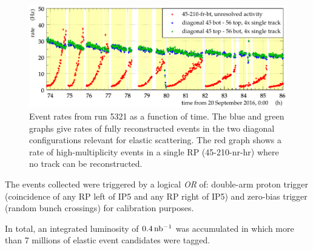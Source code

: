 \begin{figure}
\begin{center}
\includegraphics{fig/rates_vs_time.pdf}
\caption{%
Event rates from run 5321 as a function of time. The blue and green graphs give rates of fully reconstructed events in the two diagonal configurations relevant for elastic scattering. The red graph shows a rate of high-multiplicity events in a single RP (45-210-nr-hr) where no track can be reconstructed.
}
\label{fig:rates_vs_time}
\end{center}
\end{figure}

The events collected were triggered by a logical \textit{OR} of: double-arm proton trigger 
(coincidence of any RP left of IP5 and any RP right of IP5) and zero-bias trigger (random bunch crossings) for calibration purposes.

In total, an integrated luminosity of $0.4\,\rm nb^{-1}$ %
was accumulated in which more than 7 millions of elastic event candidates were tagged.
